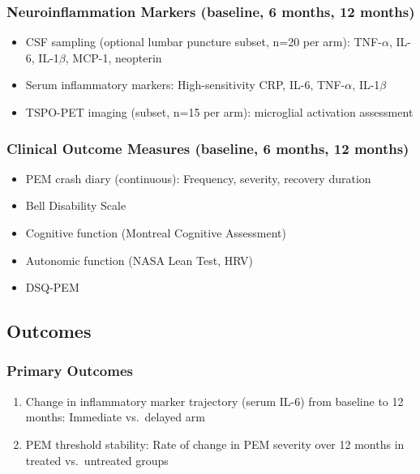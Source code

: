 \subsubsection{Neuroinflammation Markers (baseline, 6 months, 12 months)}
\begin{itemize}
    \item CSF sampling (optional lumbar puncture subset, n=20 per arm): TNF-$\alpha$, IL-6, IL-1$\beta$, MCP-1, neopterin
    \item Serum inflammatory markers: High-sensitivity CRP, IL-6, TNF-$\alpha$, IL-1$\beta$
    \item TSPO-PET imaging (subset, n=15 per arm): microglial activation assessment
\end{itemize}

\subsubsection{Clinical Outcome Measures (baseline, 6 months, 12 months)}
\begin{itemize}
    \item PEM crash diary (continuous): Frequency, severity, recovery duration
    \item Bell Disability Scale
    \item Cognitive function (Montreal Cognitive Assessment)
    \item Autonomic function (NASA Lean Test, HRV)
    \item DSQ-PEM
\end{itemize}

\subsection{Outcomes}

\subsubsection{Primary Outcomes}
\begin{enumerate}
    \item Change in inflammatory marker trajectory (serum IL-6) from baseline to 12 months: Immediate vs.\ delayed arm
    \item PEM threshold stability: Rate of change in PEM severity over 12 months in treated vs.\ untreated groups
\end{enumerate}

